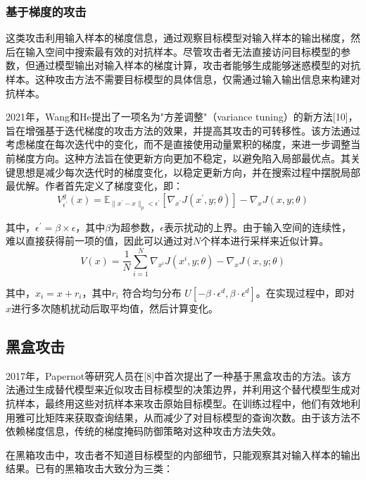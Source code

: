 \documentclass[twocolumn]{ctexart}
\renewcommand*{\songti}{\CJKfamily{zhsong}}%
\begin{document}
	\subsubsection{{\songti 基于梯度的攻击}\vspace{-0.6em}}
	这类攻击利用输入样本的梯度信息，通过观察目标模型对输入样本的输出梯度，然后在输入空间中搜索最有效的对抗样本。尽管攻击者无法直接访问目标模型的参数，但通过模型输出对输入样本的梯度计算，攻击者能够生成能够迷惑模型的对抗样本。这种攻击方法不需要目标模型的具体信息，仅需通过输入输出信息来构建对抗样本。
	
	2021年，Wang和He提出了一项名为"方差调整"（variance tuning）的新方法[10]，旨在增强基于迭代梯度的攻击方法的效果，并提高其攻击的可转移性。该方法通过考虑梯度在每次迭代中的变化，而不是直接使用动量累积的梯度，来进一步调整当前梯度方向。这种方法旨在使更新方向更加不稳定，以避免陷入局部最优点。其关键思想是减少每次迭代时的梯度变化，以稳定更新方向，并在搜索过程中摆脱局部最优解。作者首先定义了梯度变化，即：
	\begin{equation*}
		V_{\epsilon^{\prime}}^{g}(x)=\mathbb{E}_{\|x^{\prime}-x\|_{p}<\epsilon^{\prime}}\left[\nabla_{x^{\prime}}J\left(x^{\prime},y;\theta\right)\right]-\nabla_{x}J(x,y;\theta) \tag{1}
	\end{equation*}
	
	其中，${\epsilon^{\prime}} = \beta \times \epsilon $，其中$\beta$为超参数，$\epsilon$表示扰动的上界。由于输入空间的连续性，难以直接获得前一项的值，因此可以通过对$N$个样本进行采样来近似计算。
	\begin{equation*}
		V(x)=\dfrac{1}{N}\sum_{i=1}^{N}\nabla_{x^i}J\left(x^i,y;\theta\right)-\nabla_xJ(x,y;\theta) \tag{2}
	\end{equation*}
	
	其中，$x_i = x + r_i$，其中$ r_i$ 符合均匀分布 $U[-\beta \cdot \epsilon^d, \beta \cdot \epsilon^d]$。在实现过程中，即对 $x$进行多次随机扰动后取平均值，然后计算变化。
	\subsection{{\songti 黑盒攻击}\vspace{-0.6em}}
	2017年，Papernot等研究人员在[8]中首次提出了一种基于黑盒攻击的方法。该方法通过生成替代模型来近似攻击目标模型的决策边界，并利用这个替代模型生成对抗样本，最终用这些对抗样本来攻击原始目标模型。在训练过程中，他们有效地利用雅可比矩阵来获取查询结果，从而减少了对目标模型的查询次数。由于该方法不依赖梯度信息，传统的梯度掩码防御策略对这种攻击方法失效。
	
	在黑箱攻击中，攻击者不知道目标模型的内部细节，只能观察其对输入样本的输出结果。已有的黑箱攻击大致分为三类：
\end{document}
